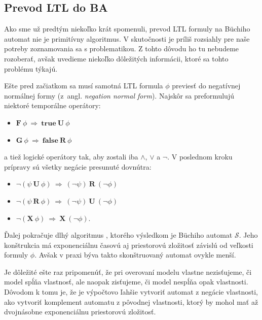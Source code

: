 \documentclass[11pt,final,oneside]{fithesis}
\begin{document}
\subsection{Prevod LTL do BA}
\label{sec:ltltoba}
Ako sme u\v z predt\'ym nieko\v lko kr\'at spomenuli, prevod LTL formuly na B\"uchiho automat nie je primit\'ivny algoritmus. V skuto\v cnosti je pr\'ili\v s
rozsiahly pre na\v se potreby zoznamovania sa s problematikou. Z tohto d\^ ovodu ho tu nebudeme rozobera\v t, av\v sak uvedieme nieko\v lko d\^ ole\v zit\'ych 
inform\'acii, ktor\'e sa tohto probl\'emu t\'ykaj\'u.

E\v ste pred za\v ciatkom sa mus\'i samotn\'a LTL formula $\phi$ previes\v t do negat\'ivnej norm\'alnej formy (z~angl. \textit{negation normal form}). 
Najsk\^ or sa preformuluj\'u niektor\'e tempor\'alne oper\'atory:
\begin{itemize}
\item $\mathbf{F}\ \phi \ \Rightarrow \ \mathbf{true\ U}\ \phi$
\item $\mathbf{G}\ \phi \ \Rightarrow \ \mathbf{false\ R}\ \phi$
\end{itemize}
a tie\v z logick\'e oper\'atory tak, aby zostali iba $\wedge$, $\vee$ a $\neg$. V poslednom kroku pr\'ipravy s\'u v\v setky neg\'acie presunut\'e dovn\'utra:
\begin{itemize}
\item $\neg(\psi\ \mathbf{U}\ \phi) \ \Rightarrow \ (\neg\psi)\ \mathbf{R}\ (\neg\phi)$
\item $\neg(\psi\ \mathbf{R}\ \phi) \ \Rightarrow \ (\neg\psi)\ \mathbf{U}\ (\neg\phi)$
\item $\neg(\mathbf{X}\ \phi) \ \Rightarrow \ \mathbf{X}\ (\neg\phi)$.
\end{itemize}

\v Dalej pokra\v cuje dlh\'y algoritmus \cite{Clarke:MC:LTLtoBA}, ktor\'eho v\'ysledkom je B\"uchiho automat $\mathcal{S}$. Jeho kon\v strukcia m\'a exponenci\'alnu \v casov\'u
aj priestorov\'u zlo\v zitos\v t z\'avisl\'u od ve\v lkosti formuly $\phi$. Av\v sak v praxi b\'yva takto skon\v struovan\'y automat ovykle men\v s\'i.

Je d\^ ole\v zit\'e e\v ste raz pripomen\'u\v t, \v ze pri overovan\'i modelu vlastne nezis\v tujeme, \v ci model sp\'l\v na vlastnos\v t, ale naopak 
zis\v tujeme, \v ci model nesp\'l\v na opak vlastnosti. D\^ ovodom k tomu je, \v ze je v\'ypo\v ctovo \v lah\v sie vytvori\v t automat z neg\'acie vlastnosti,
ako vytvori\v t komplement automatu z p\^ ovodnej vlastnosti, ktor\'y by mohol ma\v t a\v z dvojn\'asobne exponenci\'alnu priestorov\'u zlo\v zitos\v t.
\cite{Clarke:MC:LTLtoBA}
\end{document}
